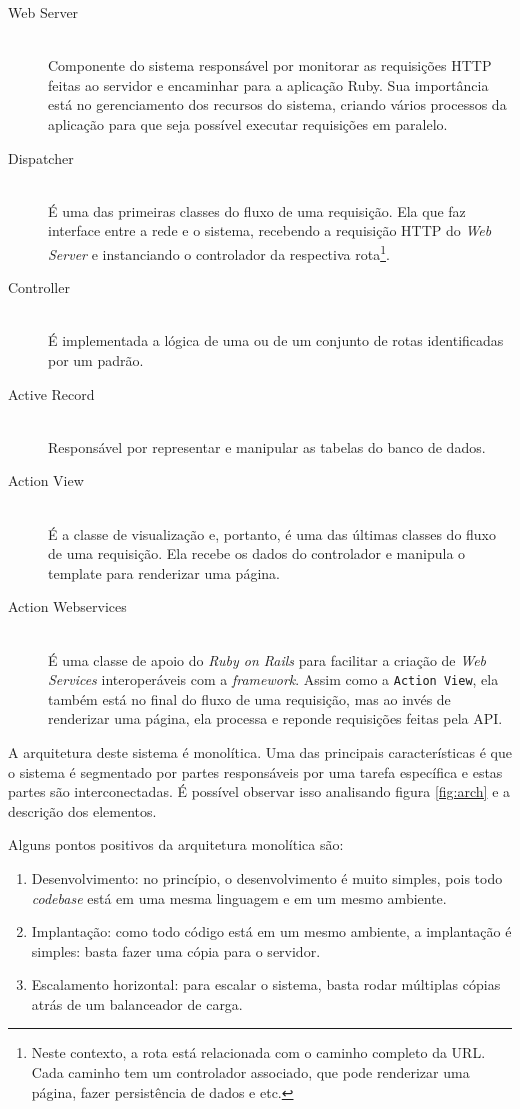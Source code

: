 \begin{description}
  \item[Web Server] \hfill \\ Componente do sistema responsável por monitorar as requisições HTTP feitas ao servidor e encaminhar para a aplicação Ruby. Sua importância está no gerenciamento dos recursos do sistema, criando vários processos da aplicação para que seja possível executar requisições em paralelo.
  \item[Dispatcher] \hfill \\ É uma das primeiras classes do fluxo de uma requisição. Ela que faz interface entre a rede e o sistema, recebendo a requisição HTTP do \emph{Web Server} e instanciando o controlador da respectiva rota\footnote{Neste contexto, a rota está relacionada com o caminho completo da URL. Cada caminho tem um controlador associado, que pode renderizar uma página, fazer persistência de dados e etc.}.
  \item[Controller] \hfill \\ É implementada a lógica de uma ou de um conjunto de rotas identificadas por um padrão.
  \item[Active Record] \hfill \\ Responsável por representar e manipular as tabelas do banco de dados.
  \item[Action View] \hfill \\ É a classe de visualização e, portanto, é uma das últimas classes do fluxo de uma requisição. Ela recebe os dados do controlador e manipula o template para renderizar uma página.
  \item[Action Webservices] \hfill \\ É uma classe de apoio do \emph{Ruby on Rails} para facilitar a criação de \emph{Web Services} interoperáveis com a \emph{framework}. Assim como a \texttt{Action View}, ela também está no final do fluxo de uma requisição, mas ao invés de renderizar uma página, ela processa e reponde requisições feitas pela API.
\end{description}

A arquitetura deste sistema é monolítica. Uma das principais características é que o sistema é segmentado por partes responsáveis por uma tarefa específica e estas partes são interconectadas. É possível observar isso analisando figura \ref{fig:arch} e a descrição dos elementos.

Alguns pontos positivos da arquitetura monolítica são:

\begin{enumerate}
  \item Desenvolvimento: no princípio, o desenvolvimento é muito simples, pois todo \emph{codebase} está em uma mesma linguagem e em um mesmo ambiente.
  \item Implantação: como todo código está em um mesmo ambiente, a implantação é simples: basta fazer uma cópia para o servidor.
  \item Escalamento horizontal: para escalar o sistema, basta rodar múltiplas cópias atrás de um balanceador de carga.
\end{enumerate}

